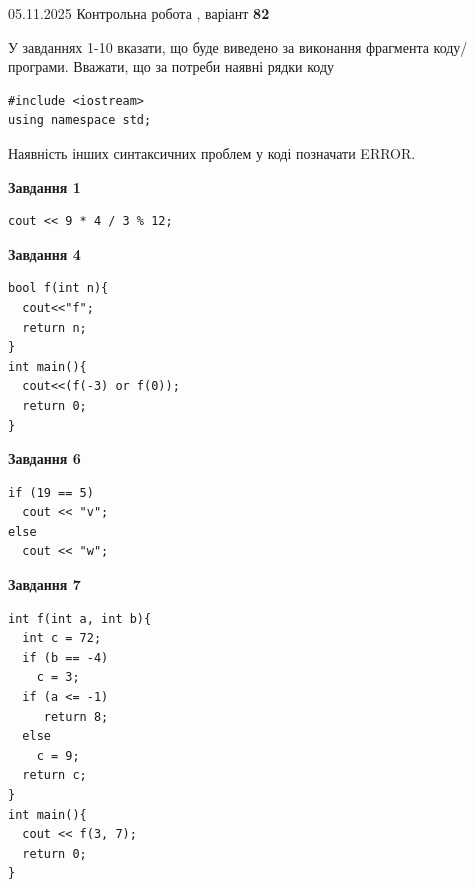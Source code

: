 \documentclass[12pt, ukrainian]{article}
\begin{document}
\newpage

{\Large{05.11.2025 Контрольна робота , варіант  \No \textbf { 82 }\par}}
{
\begin {large}
У завданнях 1-10 вказати, що буде виведено за виконання фрагмента коду/про\-гра\-ми.
Вважати, що за потреби наявні рядки коду
\begin{verbatim}
#include <iostream>
using namespace std;
\end{verbatim}
Наявність інших синтаксичних проблем у коді позначати ERROR.

\begin{minipage}[t]{7.0cm}

\begin{center}
\textbf{Завдання 1}
\end{center}
\vspace{-8mm}

\begin{verbatim}
cout << 9 * 4 / 3 % 12;
\end{verbatim}



\begin{center}
\textbf{Завдання 4}
\end{center}
\vspace{-8mm}

\begin{verbatim}
bool f(int n){
  cout<<"f";
  return n;
}
int main(){
  cout<<(f(-3) or f(0));
  return 0;
}
\end{verbatim}



\begin{center}
\textbf{Завдання 6}
\end{center}
\vspace{-8mm}

\begin{verbatim}
if (19 == 5)
  cout << "v";
else
  cout << "w";
\end{verbatim}



\begin{center}
\textbf{Завдання 7}
\end{center}
\vspace{-8mm}

\begin{verbatim}
int f(int a, int b){
  int c = 72;
  if (b == -4)
    c = 3;
  if (a <= -1)
     return 8;
  else
    c = 9;
  return c;
}
int main(){
  cout << f(3, 7);
  return 0;
}
\end{verbatim}


\end{minipage}
\end{large}}
\end{document}
